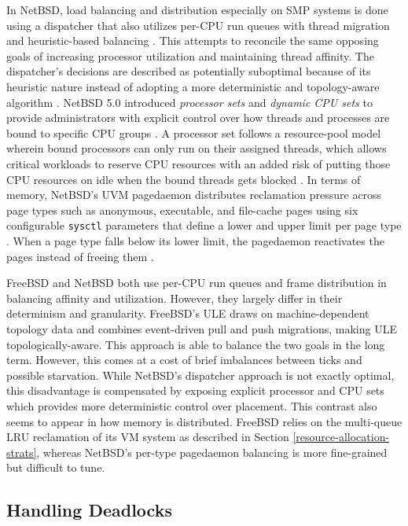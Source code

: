 In NetBSD, load balancing and distribution especially on SMP systems is done using a dispatcher that also utilizes per-CPU run queues with
thread migration and heuristic-based balancing \parencite{rasiukevicius2009}. This attempts to reconcile the same opposing goals of
increasing processor utilization and maintaining thread affinity. The dispatcher's decisions are described as potentially suboptimal
because of its heuristic nature instead of adopting a more deterministic and topology-aware algorithm \parencite{rasiukevicius2009}.
NetBSD 5.0 introduced \textit{processor sets} and \textit{dynamic CPU sets} to provide administrators with explicit control over how threads
and processes are bound to specific CPU groups \parencite{netbsd_5_0}. A processor set follows a resource-pool model wherein bound
processors can only run on their assigned threads, which allows critical workloads to reserve CPU resources with an added risk of
putting those CPU resources on idle when the bound threads gets blocked \parencite{netbsd_5_0}. In terms of memory, NetBSD's UVM
pagedaemon distributes reclamation pressure across page types such as anonymous, executable, and file-cache pages using six configurable
\texttt{sysctl} parameters that define a lower and upper limit per page type \parencite{selonen}. When a page type falls below its
lower limit, the pagedaemon reactivates the pages instead of freeing them \parencite{selonen}.

FreeBSD and NetBSD both use per-CPU run queues and frame distribution in balancing affinity and utilization. However, they largely differ
in their determinism and granularity. FreeBSD's ULE draws on machine-dependent topology data and combines event-driven pull and push
migrations, making ULE topologically-aware. This approach is able to balance the two goals in the long term. However, this comes at a
cost of brief imbalances between ticks and possible starvation. While NetBSD's dispatcher approach is not exactly optimal, this
disadvantage is compensated by exposing explicit processor and CPU sets which provides more deterministic control over placement.
This contrast also seems to appear in how memory is distributed. FreeBSD relies on the multi-queue LRU reclamation of its VM system
as described in Section \ref{resource-allocation-strats}, whereas NetBSD's per-type pagedaemon balancing is more fine-grained but
difficult to tune.

\subsection{Handling Deadlocks} \label{handling-deadlock} %

